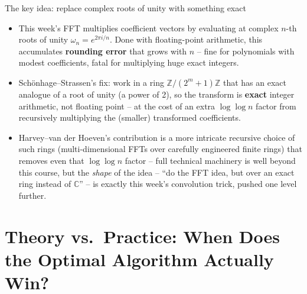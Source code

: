 \documentclass[11pt,aspectratio=169]{beamer}
\begin{document}
\begin{frame}{The key idea: replace complex roots of unity with something exact}
  \begin{itemize}
    \item This week's FFT multiplies coefficient vectors by evaluating at complex
    $n$-th roots of unity $\omega_n = e^{2\pi i/n}$. Done with floating-point
    arithmetic, this accumulates \textbf{rounding error} that grows with $n$ --
    fine for polynomials with modest coefficients, fatal for multiplying huge
    exact integers.
    \item Schönhage--Strassen's fix: work in a ring $\mathbb{Z}/(2^m+1)\mathbb{Z}$ that
    has an exact analogue of a root of unity (a power of 2), so the transform is
    \textbf{exact} integer arithmetic, not floating point -- at the cost of an extra
    $\log\log n$ factor from recursively multiplying the (smaller) transformed
    coefficients.
    \item Harvey--van der Hoeven's contribution is a more intricate recursive choice of
    such rings (multi-dimensional FFTs over carefully engineered finite rings) that
    removes even that $\log\log n$ factor -- full technical machinery is well beyond this
    course, but the \emph{shape} of the idea -- ``do the FFT idea, but over an exact
    ring instead of $\mathbb{C}$'' -- is exactly this week's convolution trick, pushed
    one level further.
  \end{itemize}
\end{frame}

\section{Theory vs.\ Practice: When Does the Optimal Algorithm Actually Win?}
\end{document}
